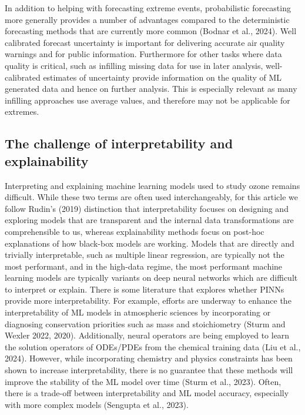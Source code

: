 \documentclass[gmd, manuscript]{copernicus}
\begin{document}
In addition to helping with forecasting extreme events, probabilistic forecasting more generally provides a number of advantages compared to the deterministic forecasting methods that are currently more common (Bodnar et al., 2024). Well calibrated forecast uncertainty is important for delivering accurate air quality warnings and for public information. Furthermore for other tasks where data quality is critical, such as infilling missing data for use in later analysis, well-calibrated estimates of uncertainty provide information on the quality of ML generated data and hence on further analysis. This is especially relevant as many infilling approaches use average values, and therefore may not be applicable for extremes. 

\subsection{The challenge of interpretability and explainability}
Interpreting and explaining machine learning models used to study ozone remains difficult. While these two terms are often used interchangeably, for this article we follow Rudin’s (2019) distinction that interpretability focuses on designing and exploring models that are transparent and the internal data transformations are comprehensible to us, whereas explainability methods focus on post-hoc explanations of how black-box models are working. Models that are directly and trivially interpretable, such as multiple linear regression, are typically not the most performant, and in the high-data regime, the most performant machine learning models are typically variants on deep neural networks which are difficult to interpret or explain. There is some literature that explores whether PINNs provide more interpretability. For example, efforts are underway to enhance the interpretability of ML models in atmospheric sciences by incorporating or diagnosing conservation priorities such as mass and stoichiometry (Sturm and Wexler 2022, 2020). Additionally, neural operators are being employed to learn the solution operators of ODEs/PDEs from the chemical training data (Liu et al., 2024). However, while incorporating chemistry and physics constraints has been shown to increase interpretability, there is no guarantee that these methods will improve the stability of the ML model over time (Sturm et al., 2023). Often, there is a trade-off between interpretability and ML model accuracy, especially with more complex models (Sengupta et al., 2023).
\end{document}
